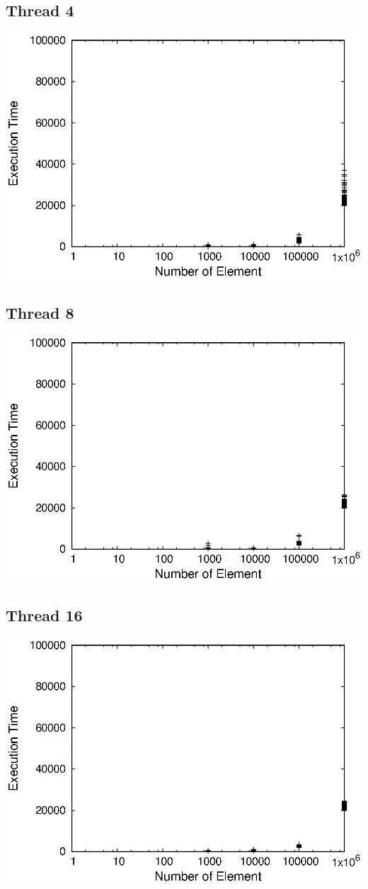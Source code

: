 \documentclass{article}
\begin{document}
\subsection{Thread 4}
\includegraphics{partA_t3}
\subsection{Thread 8}
\includegraphics{partA_t4}
\subsection{Thread 16}
\includegraphics{partA_t5}
\end{document}
